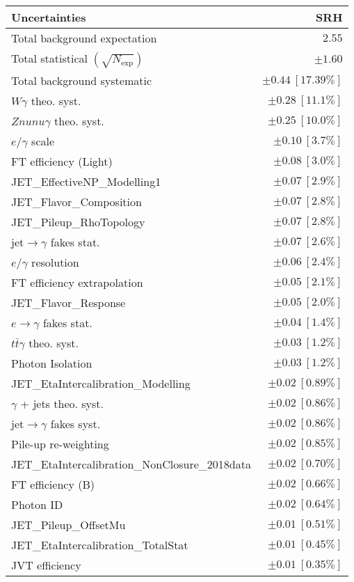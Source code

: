 \begin{tabular}{lr}
\hline
\textbf{Uncertainties} & \textbf{SRH} \\
\hline
Total background expectation & $2.55$ \\
\hline
Total statistical $(\sqrt{N_\mathrm{exp}})$ & $\pm 1.60$ \\
Total background systematic & $\pm 0.44\ [17.39\%]$ \\
\hline
\hline
$W\gamma$ theo. syst. & $\pm 0.28\ [11.1\%]$ \\
$Znunu\gamma$ theo. syst. & $\pm 0.25\ [10.0\%]$ \\
$e/\gamma$ scale & $\pm 0.10\ [3.7\%]$ \\
FT efficiency (Light) & $\pm 0.08\ [3.0\%]$ \\
JET\_EffectiveNP\_Modelling1 & $\pm 0.07\ [2.9\%]$ \\
JET\_Flavor\_Composition & $\pm 0.07\ [2.8\%]$ \\
JET\_Pileup\_RhoTopology & $\pm 0.07\ [2.8\%]$ \\
jet$\to\gamma$ fakes stat. & $\pm 0.07\ [2.6\%]$ \\
$e/\gamma$ resolution & $\pm 0.06\ [2.4\%]$ \\
FT efficiency extrapolation & $\pm 0.05\ [2.1\%]$ \\
JET\_Flavor\_Response & $\pm 0.05\ [2.0\%]$ \\
$e\to\gamma$ fakes stat. & $\pm 0.04\ [1.4\%]$ \\
$t\bar{t}\gamma$ theo. syst. & $\pm 0.03\ [1.2\%]$ \\
Photon Isolation & $\pm 0.03\ [1.2\%]$ \\
JET\_EtaIntercalibration\_Modelling & $\pm 0.02\ [0.89\%]$ \\
$\gamma$ + jets theo. syst. & $\pm 0.02\ [0.86\%]$ \\
jet$\to\gamma$ fakes syst. & $\pm 0.02\ [0.86\%]$ \\
Pile-up re-weighting & $\pm 0.02\ [0.85\%]$ \\
JET\_EtaIntercalibration\_NonClosure\_2018data & $\pm 0.02\ [0.70\%]$ \\
FT efficiency (B) & $\pm 0.02\ [0.66\%]$ \\
Photon ID & $\pm 0.02\ [0.64\%]$ \\
JET\_Pileup\_OffsetMu & $\pm 0.01\ [0.51\%]$ \\
JET\_EtaIntercalibration\_TotalStat & $\pm 0.01\ [0.45\%]$ \\
JVT efficiency & $\pm 0.01\ [0.35\%]$ \\

\end{tabular}
